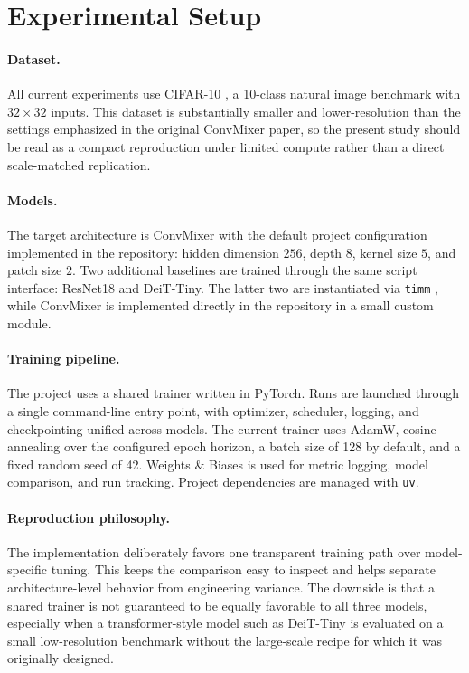 \section{Experimental Setup}

\paragraph{Dataset.}
All current experiments use CIFAR-10 \citep{krizhevsky2009learning}, a 10-class natural image benchmark with $32 \times 32$ inputs. This dataset is substantially smaller and lower-resolution than the settings emphasized in the original ConvMixer paper, so the present study should be read as a compact reproduction under limited compute rather than a direct scale-matched replication.

\paragraph{Models.}
The target architecture is ConvMixer with the default project configuration implemented in the repository: hidden dimension $256$, depth $8$, kernel size $5$, and patch size $2$. Two additional baselines are trained through the same script interface: ResNet18 and DeiT-Tiny. The latter two are instantiated via \texttt{timm} \citep{wightman2019timm}, while ConvMixer is implemented directly in the repository in a small custom module.

\paragraph{Training pipeline.}
The project uses a shared trainer written in PyTorch. Runs are launched through a single command-line entry point, with optimizer, scheduler, logging, and checkpointing unified across models. The current trainer uses AdamW, cosine annealing over the configured epoch horizon, a batch size of 128 by default, and a fixed random seed of 42. Weights \& Biases is used for metric logging, model comparison, and run tracking. Project dependencies are managed with \texttt{uv}.

\paragraph{Reproduction philosophy.}
The implementation deliberately favors one transparent training path over model-specific tuning. This keeps the comparison easy to inspect and helps separate architecture-level behavior from engineering variance. The downside is that a shared trainer is not guaranteed to be equally favorable to all three models, especially when a transformer-style model such as DeiT-Tiny is evaluated on a small low-resolution benchmark without the large-scale recipe for which it was originally designed.

